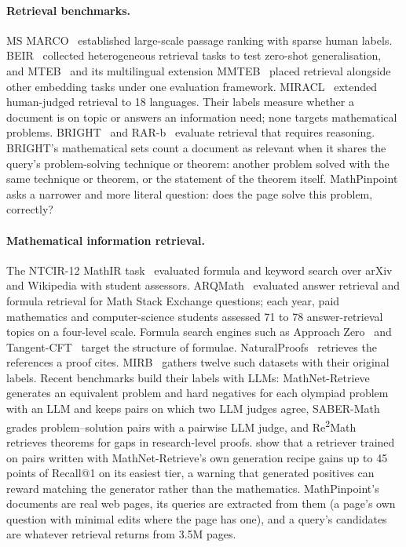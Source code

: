 \paragraph{Retrieval benchmarks.}
MS MARCO~\citep{bajaj2018msmarco} established large-scale passage ranking with sparse human labels. BEIR~\citep{thakur2021beir} collected heterogeneous retrieval tasks to test zero-shot generalisation, and MTEB~\citep{muennighoff2023mteb} and its multilingual extension MMTEB~\citep{enevoldsen2025mmteb} placed retrieval alongside other embedding tasks under one evaluation framework. MIRACL~\citep{zhang2023miracl} extended human-judged retrieval to 18 languages. Their labels measure whether a document is on topic or answers an information need; none targets mathematical problems. BRIGHT~\citep{su2025bright} and RAR-b~\citep{xiao2024rarb} evaluate retrieval that requires reasoning. BRIGHT's mathematical sets count a document as relevant when it shares the query's problem-solving technique or theorem: another problem solved with the same technique or theorem, or the statement of the theorem itself. MathPinpoint asks a narrower and more literal question: does the page solve this problem, correctly?

\paragraph{Mathematical information retrieval.}
The NTCIR-12 MathIR task~\citep{zanibbi2016ntcir12} evaluated formula and keyword search over arXiv and Wikipedia with student assessors. ARQMath~\citep{zanibbi2020arqmath,mansouri2021arqmath2,mansouri2022arqmath3} evaluated answer retrieval and formula retrieval for Math Stack Exchange questions; each year, paid mathematics and computer-science students assessed 71 to 78 answer-retrieval topics on a four-level scale. Formula search engines such as Approach Zero~\citep{zhong2019approachzero,zhong2020approachzero} and Tangent-CFT~\citep{mansouri2019tangentcft} target the structure of formulae. NaturalProofs~\citep{welleck2021naturalproofs} retrieves the references a proof cites. MIRB~\citep{ju2025mirb} gathers twelve such datasets with their original labels. Recent benchmarks build their labels with LLMs: MathNet-Retrieve~\citep{alshammari2026mathnet} generates an equivalent problem and hard negatives for each olympiad problem with an LLM and keeps pairs on which two LLM judges agree, SABER-Math~\citep{georgiev2026sabermath} grades problem--solution pairs with a pairwise LLM judge, and Re\textsuperscript{2}Math~\citep{lyu2026re2math} retrieves theorems for gaps in research-level proofs. \citet{habibullah2026recipe} show that a retriever trained on pairs written with MathNet-Retrieve's own generation recipe gains up to 45 points of Recall@1 on its easiest tier, a warning that generated positives can reward matching the generator rather than the mathematics. MathPinpoint's documents are real web pages, its queries are extracted from them (a page's own question with minimal edits where the page has one), and a query's candidates are whatever retrieval returns from 3.5M pages.

